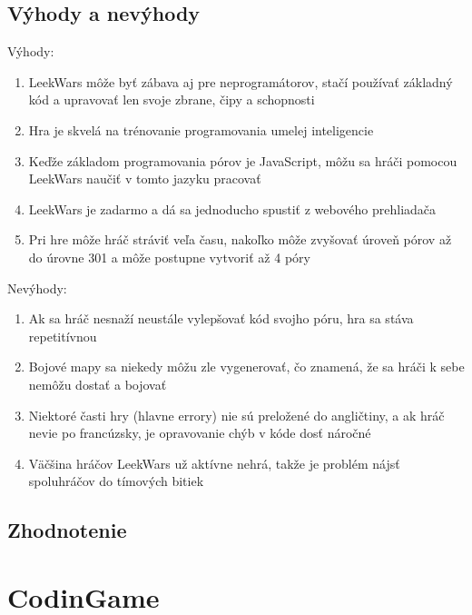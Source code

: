 \documentclass[slovak,a4paper,11pt]{article}
\begin{document}
\subsection{Výhody a nevýhody}
Výhody:
\begin{enumerate}
\item LeekWars môže byť zábava aj pre neprogramátorov, stačí používať základný kód a upravovať len svoje zbrane, čipy a schopnosti
\item Hra je skvelá na trénovanie programovania umelej inteligencie
\item Keďže základom programovania pórov je JavaScript, môžu sa hráči pomocou LeekWars naučiť v tomto jazyku pracovať 
\item LeekWars je zadarmo a dá sa jednoducho spustiť z webového prehliadača
\item Pri hre môže hráč stráviť veľa času, nakoľko môže zvyšovať úroveň pórov až do úrovne 301 a môže postupne vytvoriť až 4 póry
\end{enumerate}
Nevýhody:
\begin{enumerate}
\item Ak sa hráč nesnaží neustále vylepšovať kód svojho póru, hra sa stáva repetitívnou
\item Bojové mapy sa niekedy môžu zle vygenerovať, čo znamená, že sa hráči k sebe nemôžu dostať a bojovať
\item Niektoré časti hry (hlavne errory) nie sú preložené do angličtiny, a ak hráč nevie po francúzsky, je opravovanie chýb v kóde dosť náročné
\item Väčšina hráčov LeekWars už aktívne nehrá, takže je problém nájsť spoluhráčov do tímových bitiek
\end{enumerate}
\subsection{Zhodnotenie}

\section{CodinGame}
\end{document}
